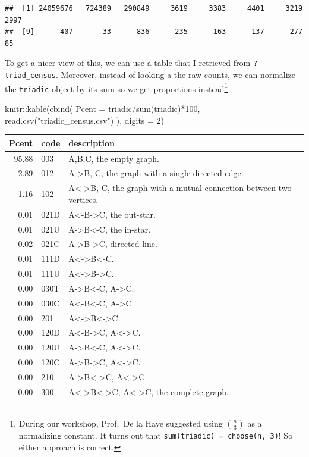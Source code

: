 \documentclass[
]{book}
\newenvironment{Shaded}{\begin{snugshade}}{\end{snugshade}}
\newcommand{\AttributeTok}[1]{\textcolor[rgb]{0.77,0.63,0.00}{#1}}
\newcommand{\DecValTok}[1]{\textcolor[rgb]{0.00,0.00,0.81}{#1}}
\newcommand{\FunctionTok}[1]{\textcolor[rgb]{0.00,0.00,0.00}{#1}}
\newcommand{\NormalTok}[1]{#1}
\newcommand{\SpecialCharTok}[1]{\textcolor[rgb]{0.00,0.00,0.00}{#1}}
\newcommand{\StringTok}[1]{\textcolor[rgb]{0.31,0.60,0.02}{#1}}
\begin{document}
\begin{verbatim}
##  [1] 24059676   724389   290849     3619     3383     4401     3219     2997
##  [9]      407       33      836      235      163      137      277       85
\end{verbatim}

To get a nicer view of this, we can use a table that I retrieved from \texttt{?triad\_census}. Moreover, instead of looking a the raw counts, we can normalize the \texttt{triadic} object by its sum so we get proportions instead\footnote{During our workshop, Prof.~De la Haye suggested using \({n \choose 3}\) as a normalizing constant. It turns out that \texttt{sum(triadic)\ =\ choose(n,\ 3)}! So either approach is correct.}

\begin{Shaded}
\begin{Highlighting}[]
\NormalTok{knitr}\SpecialCharTok{::}\FunctionTok{kable}\NormalTok{(}\FunctionTok{cbind}\NormalTok{(}
  \AttributeTok{Pcent =}\NormalTok{ triadic}\SpecialCharTok{/}\FunctionTok{sum}\NormalTok{(triadic)}\SpecialCharTok{*}\DecValTok{100}\NormalTok{,}
  \FunctionTok{read.csv}\NormalTok{(}\StringTok{"triadic\_census.csv"}\NormalTok{)}
\NormalTok{  ), }\AttributeTok{digits =} \DecValTok{2}\NormalTok{)}
\end{Highlighting}
\end{Shaded}

\begin{tabular}{r|l|l}
\hline
Pcent & code & description\\
\hline
95.88 & 003 & A,B,C, the empty graph.\\
\hline
2.89 & 012 & A->B, C, the graph with a single directed edge.\\
\hline
1.16 & 102 & A<->B, C, the graph with a mutual connection between two vertices.\\
\hline
0.01 & 021D & A<-B->C, the out-star.\\
\hline
0.01 & 021U & A->B<-C, the in-star.\\
\hline
0.02 & 021C & A->B->C, directed line.\\
\hline
0.01 & 111D & A<->B<-C.\\
\hline
0.01 & 111U & A<->B->C.\\
\hline
0.00 & 030T & A->B<-C, A->C.\\
\hline
0.00 & 030C & A<-B<-C, A->C.\\
\hline
0.00 & 201 & A<->B<->C.\\
\hline
0.00 & 120D & A<-B->C, A<->C.\\
\hline
0.00 & 120U & A->B<-C, A<->C.\\
\hline
0.00 & 120C & A->B->C, A<->C.\\
\hline
0.00 & 210 & A->B<->C, A<->C.\\
\hline
0.00 & 300 & A<->B<->C, A<->C, the complete graph.\\
\hline
\end{tabular}
\end{document}
